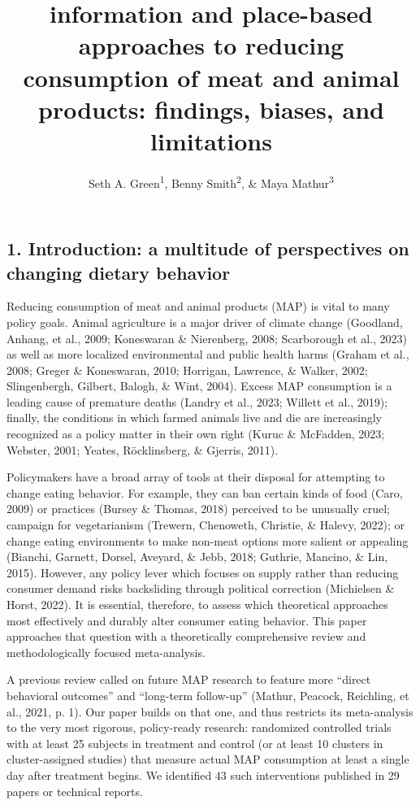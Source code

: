 \documentclass[
  man]{apa6}
\title{information and place-based approaches to reducing consumption of meat and animal products: findings, biases, and limitations}
\author{Seth A. Green\textsuperscript{1}, Benny Smith\textsuperscript{2}, \& Maya Mathur\textsuperscript{3}}
\date{}
\affiliation{\vspace{0.5cm}\textsuperscript{1} Kahneman-Treisman Center, Princeton University\\\textsuperscript{2} Allied Scholars for Animal Protection\\\textsuperscript{3} Stanford University}
\begin{document}
\maketitle

\subsection{1. Introduction: a multitude of perspectives on changing dietary behavior}\label{introduction-a-multitude-of-perspectives-on-changing-dietary-behavior}

Reducing consumption of meat and animal products (MAP) is vital to many policy goals. Animal agriculture is a major driver of climate change (Goodland, Anhang, et al., 2009; Koneswaran \& Nierenberg, 2008; Scarborough et al., 2023) as well as more localized environmental and public health harms (Graham et al., 2008; Greger \& Koneswaran, 2010; Horrigan, Lawrence, \& Walker, 2002; Slingenbergh, Gilbert, Balogh, \& Wint, 2004). Excess MAP consumption is a leading cause of premature deaths (Landry et al., 2023; Willett et al., 2019); finally, the conditions in which farmed animals live and die are increasingly recognized as a policy matter in their own right (Kuruc \& McFadden, 2023; Webster, 2001; Yeates, Röcklinsberg, \& Gjerris, 2011).

Policymakers have a broad array of tools at their disposal for attempting to change eating behavior. For example, they can ban certain kinds of food (Caro, 2009) or practices (Bursey \& Thomas, 2018) perceived to be unusually cruel; campaign for vegetarianism (Trewern, Chenoweth, Christie, \& Halevy, 2022); or change eating environments to make non-meat options more salient or appealing (Bianchi, Garnett, Dorsel, Aveyard, \& Jebb, 2018; Guthrie, Mancino, \& Lin, 2015). However, any policy lever which focuses on supply rather than reducing consumer demand risks backsliding through political correction (Michielsen \& Horst, 2022). It is essential, therefore, to assess which theoretical approaches most effectively and durably alter consumer eating behavior. This paper approaches that question with a theoretically comprehensive review and methodologically focused meta-analysis.

A previous review called on future MAP research to feature more ``direct behavioral outcomes'' and ``long-term follow-up'' (Mathur, Peacock, Reichling, et al., 2021, p. 1). Our paper builds on that one, and thus restricts its meta-analysis to the very most rigorous, policy-ready research: randomized controlled trials with at least 25 subjects in treatment and control (or at least 10 clusters in cluster-assigned studies) that measure actual MAP consumption at least a single day after treatment begins. We identified 43 such interventions published in 29 papers or technical reports.
\end{document}
